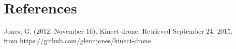 \documentclass{article}
\begin{document}




	\section{References}
	\begin{thebibliography}{1}

		 Jones, G. (2012, November 16). Kinect-drone. Retrieved September 24, 2015, from https://github.com/glennjones/kinect-drone

	\end{thebibliography}
\end{document}
